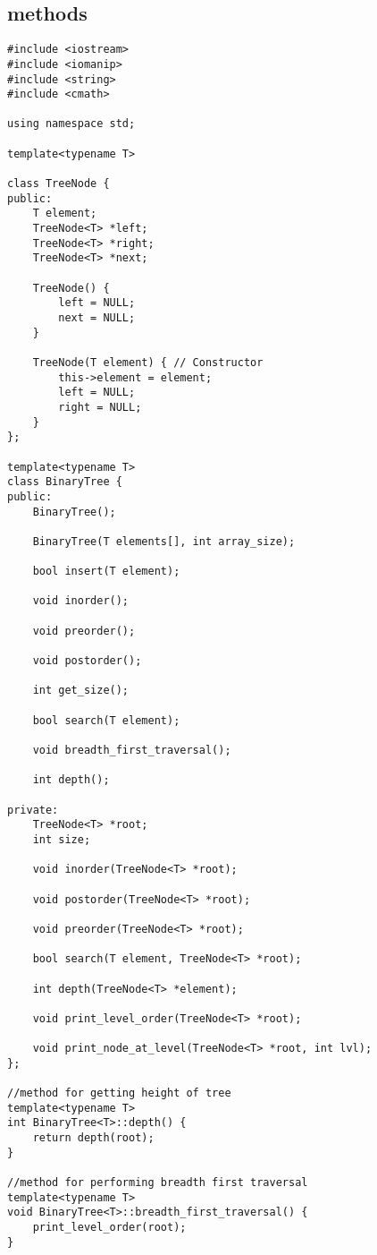 \documentclass[11pt]{article}
\begin{document}
\subsection*{methods}
\begin{lstlisting}
#include <iostream>
#include <iomanip>
#include <string>
#include <cmath>

using namespace std;

template<typename T>

class TreeNode {
public:
    T element;
    TreeNode<T> *left;
    TreeNode<T> *right;
    TreeNode<T> *next;

    TreeNode() {
        left = NULL;
        next = NULL;
    }

    TreeNode(T element) { // Constructor
        this->element = element;
        left = NULL;
        right = NULL;
    }
};

template<typename T>
class BinaryTree {
public:
    BinaryTree();

    BinaryTree(T elements[], int array_size);

    bool insert(T element);

    void inorder();

    void preorder();

    void postorder();

    int get_size();

    bool search(T element);

    void breadth_first_traversal();

    int depth();

private:
    TreeNode<T> *root;
    int size;

    void inorder(TreeNode<T> *root);

    void postorder(TreeNode<T> *root);

    void preorder(TreeNode<T> *root);

    bool search(T element, TreeNode<T> *root);

    int depth(TreeNode<T> *element);

    void print_level_order(TreeNode<T> *root);

    void print_node_at_level(TreeNode<T> *root, int lvl);
};

//method for getting height of tree
template<typename T>
int BinaryTree<T>::depth() {
    return depth(root);
}

//method for performing breadth first traversal
template<typename T>
void BinaryTree<T>::breadth_first_traversal() {
    print_level_order(root);
}


\end{lstlisting}
\end{document}
